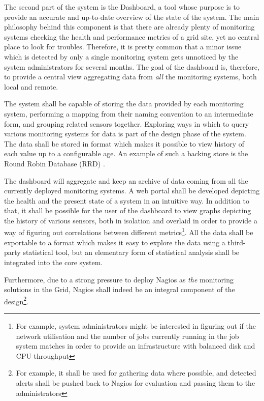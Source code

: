 \documentclass[12pt]{article}
\begin{document}
The second part of the system is the Dashboard, a tool whose purpose is to provide an accurate and up-to-date overview of the
state of the system.  The main philosophy behind this component is that there are already plenty of monitoring systems checking
the health and performance metrics of a grid site, yet no central place to look for troubles.  Therefore, it is pretty common that
a minor issue which is detected by only a single monitoring system gets unnoticed by the system administrators for several months.
The goal of the dashboard is, therefore, to provide a central view aggregating data from {\em all} the monitoring systems, both
local and remote.

The system shall be capable of storing the data provided by each monitoring system, performing a mapping from their naming
convention to an intermediate form, and grouping related sensors together.  Exploring ways in which to query various monitoring
systems for data is part of the design phase of the system.  The data shall be stored in format which makes it possible to view
history of each value up to a configurable age.  An example of such a backing store is the Round Robin Database (RRD) \cite{rrd}.

The dashboard will aggregate and keep an archive of data coming from all the currently deployed monitoring systems.  A web portal
shall be developed depicting the health and the present state of a system in an intuitive way.  In addition to that, it shall be
possible for the user of the dashboard to view graphs depicting the history of various sensors, both in isolation and overlaid in
order to provide a way of figuring out correlations between different metrics\footnote{For example, system administrators might be
interested in figuring out if the network utilisation and the number of jobs currently running in the job system matches in order
to provide an infrastructure with balanced disk and CPU throughput}.  All the data shall be exportable to a format which makes it
easy to explore the data using a third-party statistical tool, but an elementary form of statistical analysis shall be integrated
into the core system.

Furthermore, due to a strong pressure to deploy Nagios as {\em the} monitoring solutions in the Grid, Nagios shall indeed be an
integral component of the design\footnote{For example, it shall be used for gathering data where possible, and detected alerts
shall be pushed back to Nagios for evaluation and passing them to the administrators}.
\end{document}
